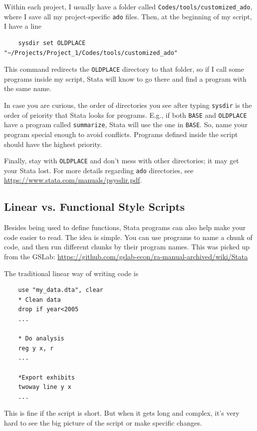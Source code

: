 Within each project, I usually have a folder called \verb|Codes/tools/customized_ado|, where I save all my project-specific \verb|ado| files. Then, at the beginning of my script, I have a line
\begin{verbatim}
    sysdir set OLDPLACE "~/Projects/Project_1/Codes/tools/customized_ado"
\end{verbatim}
This command redirects the \verb|OLDPLACE| directory to that folder, so if I call some programs inside my script, Stata will know to go there and find a program with the same name.

In case you are curious, the order of directories you see after typing \verb|sysdir| is the order of priority that Stata looks for programs. E.g., if both \verb|BASE| and \verb|OLDPLACE| have a program called \verb|summarize|, Stata will use the one in \verb|BASE|. So, name your program special enough to avoid conflicts. Programs defined inside the script should have the highest priority. 

Finally, stay with \verb|OLDPLACE| and don't mess with other directories; it may get your Stata lost. For more details regarding \verb|ado| directories, see \url{https://www.stata.com/manuals/psysdir.pdf}.

\subsection{Linear vs. Functional Style Scripts}
Besides being used to define functions, Stata programs can also help make your code easier to read. The idea is simple. You can use programs to name a chunk of code, and then run different chunks by their program names. This was picked up from the GSLab: \url{https://github.com/gslab-econ/ra-manual-archived/wiki/Stata}

The traditional linear way of writing code is
\begin{verbatim}
    use "my_data.dta", clear 
    * Clean data
    drop if year<2005
    ...

    * Do analysis
    reg y x, r 
    ... 

    *Export exhibits
    twoway line y x
    ...
\end{verbatim}
This is fine if the script is short. But when it gets long and complex, it's very hard to see the big picture of the script or make specific changes. 

